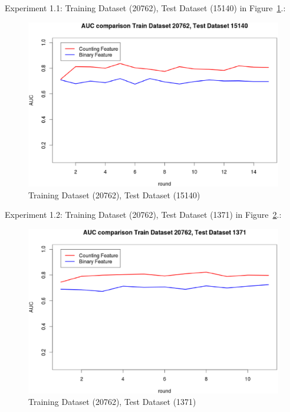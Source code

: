 \documentclass{sig-alternate}
\begin{document}
\iffalse
Experiment 1.1: Training Dataset  (20762), Test Dataset  (15140) in Figure~\ref{fig:fig1}.:
\begin{figure}[h]
\centering
\includegraphics[width=\columnwidth]{20762_15140.eps}
\caption{Training Dataset  (20762), Test Dataset  (15140)}
\label{fig:fig1}
\end{figure}

Experiment 1.2: Training Dataset  (20762), Test Dataset  (1371) in Figure~\ref{fig:fig2}.:
\begin{figure}[h]
\centering
\includegraphics[width=\columnwidth]{20762_1371.eps}
\caption{Training Dataset  (20762), Test Dataset  (1371)}
\label{fig:fig2}
\end{figure}
\end{document}
